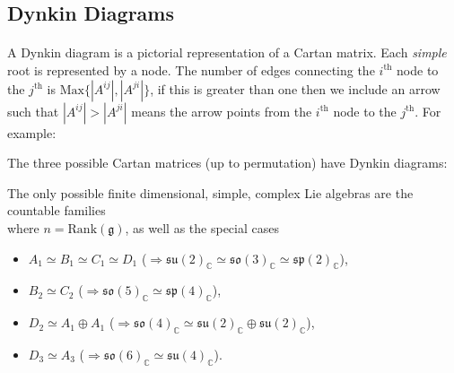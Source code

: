 \documentclass[11pt,fleqn]{article}
\begin{document}
\subsection{Dynkin Diagrams}

\paragraph{} A Dynkin diagram is a pictorial representation of a Cartan matrix. Each \textit{simple} root is represented by a node. The number of edges connecting the $i^\text{th}$ node to the $j^\text{th}$ is $\text{Max}\{ |A^{ij}|,|A^{ji}|\}$, if this is greater than one then we include an arrow such that $|A^{ij}| > |A^{ji}|$ means the arrow points from the $i^\text{th}$ node to the $j^\text{th}$. For example:
\begin{example}
The three possible Cartan matrices (up to permutation) have Dynkin diagrams:
	\begin{center}
		
	\end{center}
\end{example}

\begin{theorem}
	The only possible finite dimensional, simple, complex Lie algebras are the countable families
		\\
	where $n = \text{Rank}(\mathfrak{g})$, as well as the special cases
		\begin{center}
			
		\end{center}
\end{theorem}
\begin{remark}\hfill
	\begin{itemize}
		\item $A_1 \simeq B_1 \simeq C_1 \simeq D_1$ ($\Rightarrow \mathfrak{su}(2)_\mathbb{C} \simeq \mathfrak{so}(3)_\mathbb{C} \simeq \mathfrak{sp}(2)_\mathbb{C}$),
		\item $B_2 \simeq C_2$ ($\Rightarrow \mathfrak{so}(5)_\mathbb{C} \simeq \mathfrak{sp}(4)_\mathbb{C}$),
		\item $D_2 \simeq A_1 \oplus A_1$ ($\Rightarrow \mathfrak{so}(4)_\mathbb{C} \simeq \mathfrak{su}(2)_\mathbb{C} \oplus \mathfrak{su}(2)_\mathbb{C}$),
		\item $D_3 \simeq A_3$ ($\Rightarrow \mathfrak{so}(6)_\mathbb{C} \simeq \mathfrak{su}(4)_\mathbb{C}$).
	\end{itemize}
\end{remark}
\end{document}
